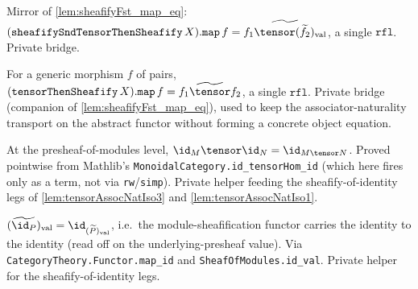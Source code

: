 \begin{lemma}

  \label{lem:sheafifySnd_map_eq}
  Mirror of \cref{lem:sheafifyFst_map_eq}:
  $(\texttt{sheafifySndTensorThenSheafify}\,X).\texttt{map}\,f
  = \widetilde{f_1 \tensor (\widetilde{f_2})_{\mathrm{val}}}$, a single $\texttt{rfl}$. Private bridge.
\end{lemma}

\begin{lemma}

  \label{lem:tensorThenSheafify_map_eq}
  For a generic morphism $f$ of pairs,
  $(\texttt{tensorThenSheafify}\,X).\texttt{map}\,f = \widetilde{f_1 \tensor f_2}$, a single
  $\texttt{rfl}$. Private bridge (companion of \cref{lem:sheafifyFst_map_eq}), used to keep
  the associator-naturality transport on the abstract functor without forming a concrete
  object equation.
\end{lemma}

\begin{lemma}

\leanok
[Presheaf-level $\id \tensor \id = \id$]
  \label{lem:presheaf_id_tensorHom_id}
  At the presheaf-of-modules level, $\id_M \tensor \id_N = \id_{M \tensor N}$. Proved
  pointwise from Mathlib's \texttt{MonoidalCategory.id\_tensorHom\_id} (which here fires only
  as a term, not via \texttt{rw}/\texttt{simp}). Private helper feeding the sheafify-of-identity
  legs of \cref{lem:tensorAssocNatIso3} and \cref{lem:tensorAssocNatIso1}.
\end{lemma}

\begin{lemma}

  \label{lem:sheafify_map_id_val}
  $(\widetilde{\id_P})_{\mathrm{val}} = \id_{(\widetilde{P})_{\mathrm{val}}}$, i.e.\ the
  module-sheafification functor carries the identity to the identity (read off on the
  underlying-presheaf value). Via \texttt{CategoryTheory.Functor.map\_id} and
  \texttt{SheafOfModules.id\_val}. Private helper for the sheafify-of-identity legs.
\end{lemma}

